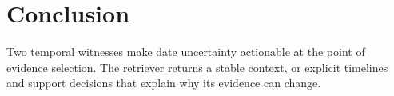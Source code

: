\section{Conclusion}
Two temporal witnesses make date uncertainty actionable at the point of evidence selection.
The retriever returns a stable context, or explicit timelines and support decisions that explain why its evidence can change.
